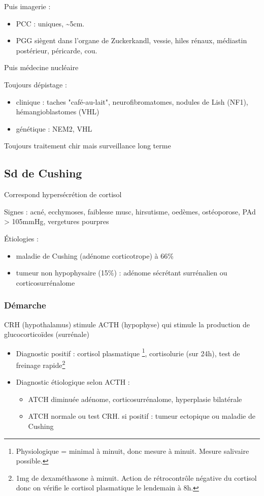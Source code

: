 \documentclass[11pt]{article}
\begin{document}
Puis imagerie : 
\begin{itemize}
\item PCC : uniques, \textasciitilde{}5cm.
\item PGG siègent dans l'organe de Zuckerkandl, vessie, hiles rénaux, médiastin postérieur, péricarde, cou.
\end{itemize}

Puis médecine nucléaire

Toujours dépistage :
\begin{itemize}
\item clinique : taches "café-au-lait", neurofibromatomes, nodules de Lish (NF1),
hémangioblastomes (VHL)
\item génétique : NEM2, VHL
\end{itemize}

Toujours traitement chir mais surveillance long terme

\subsection{Sd de Cushing}
\label{sec:org35adebd}
Correspond hypersécrétion de cortisol

Signes : acné, ecchymoses, faiblesse musc, hirsutisme, oedèmes, ostéoporose, PAd
> 105mmHg, vergetures pourpres

Étiologies :
\begin{itemize}
\item maladie de Cushing (adénome corticotrope) à 66\%
\item tumeur non hypophysaire (15\%) : adénome sécrétant surrénalien ou
corticosurrénalome
\end{itemize}

\subsubsection{Démarche}
\label{sec:org94396cc}
\begin{tcolorbox}
CRH (hypothalamus) stimule ACTH (hypophyse) qui stimule la production de
glucocorticoïdes (surrénale)
\end{tcolorbox}

\begin{itemize}
\item Diagnostic positif : cortisol plasmatique \footnote{Physiologique = minimal à minuit, donc mesure à minuit. Mesure salivaire possible.}, cortisolurie (sur 24h), test de freinage rapide\footnote{1mg de dexaméthasone à minuit. Action de rétrocontrôle négative du
cortisol donc on vérifie le cortisol plasmatique le lendemain à 8h.}

\item Diagnostic étiologique selon ACTH :
\begin{itemize}
\item ATCH diminuée \thus adénome, corticosurrénalome, hyperplasie bilatérale
\item ATCH normale ou \inc \thus test CRH. si positif : tumeur ectopique ou
maladie de Cushing
\end{itemize}
\end{itemize}
\end{document}
